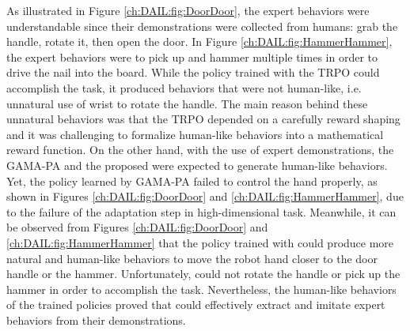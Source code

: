 As illustrated in Figure \ref{ch:DAIL:fig:DoorDoor}, the expert behaviors were understandable since their demonstrations were collected from humans: grab the handle, rotate it, then open the door.
In Figure \ref{ch:DAIL:fig:HammerHammer}, the expert behaviors were to pick up and hammer multiple times in order to drive the nail into the board.
While the policy trained with the TRPO could accomplish the task, it produced behaviors that were not human-like, i.e. unnatural use of wrist to rotate the handle.
The main reason behind these unnatural behaviors was that the TRPO depended on a carefully reward shaping and it was challenging to formalize human-like behaviors into a mathematical reward function.
On the other hand, with the use of expert demonstrations, the GAMA-PA and the proposed \DAIL{} were expected to generate human-like behaviors.
Yet, the policy learned by GAMA-PA failed to control the hand properly, as shown in Figures \ref{ch:DAIL:fig:DoorDoor} and \ref{ch:DAIL:fig:HammerHammer}, due to the failure of the adaptation step in high-dimensional task.
Meanwhile, it can be observed from Figures \ref{ch:DAIL:fig:DoorDoor} and \ref{ch:DAIL:fig:HammerHammer} that the policy trained with \DAIL{} could produce more natural and human-like behaviors to move the robot hand closer to the door handle or the hammer.
Unfortunately, \DAIL{} could not rotate the handle or pick up the hammer in order to accomplish the task.
Nevertheless, the human-like behaviors of the trained policies proved that \DAIL{} could effectively extract and imitate expert behaviors from their demonstrations.
